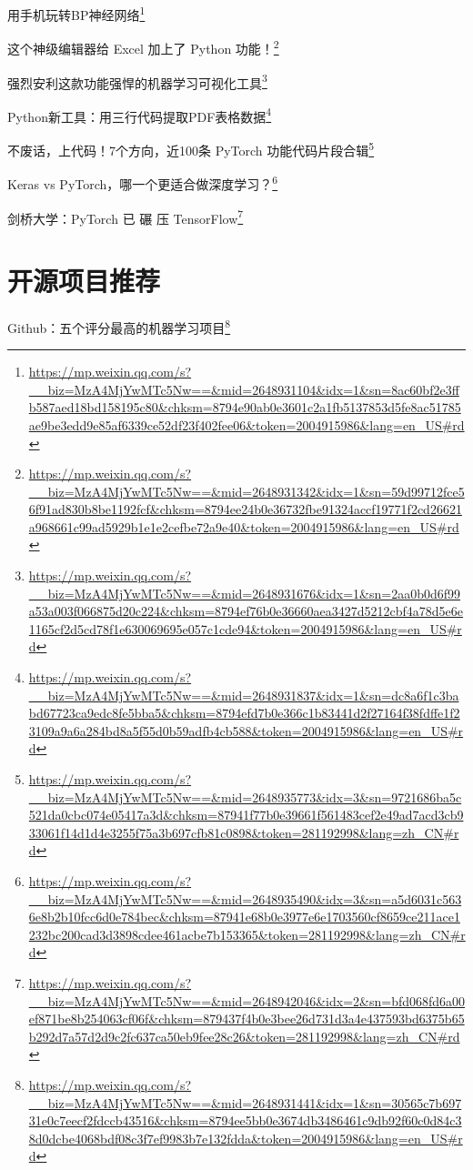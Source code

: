 \documentclass[]{ctexbook}
\renewcommand{\href}[2]{#2\footnote{\url{#1}}}
\begin{document}
\href{https://mp.weixin.qq.com/s?__biz=MzA4MjYwMTc5Nw==\&mid=2648931104\&idx=1\&sn=8ac60bf2e3ffb587aed18bd158195c80\&chksm=8794e90ab0e3601c2a1fb5137853d5fe8ac51785ae9be3edd9e85af6339ce52df23f402fee06\&token=2004915986\&lang=en_US\#rd}{用手机玩转BP神经网络}

\href{https://mp.weixin.qq.com/s?__biz=MzA4MjYwMTc5Nw==\&mid=2648931342\&idx=1\&sn=59d99712fce56f91ad830b8be1192fcf\&chksm=8794ee24b0e36732fbe91324accf19771f2cd26621a968661c99ad5929b1e1e2cefbe72a9e40\&token=2004915986\&lang=en_US\#rd}{这个神级编辑器给 Excel 加上了 Python 功能！}

\href{https://mp.weixin.qq.com/s?__biz=MzA4MjYwMTc5Nw==\&mid=2648931676\&idx=1\&sn=2aa0b0d6f99a53a003f066875d20c224\&chksm=8794ef76b0e36660aea3427d5212cbf4a78d5e6e1165cf2d5cd78f1e630069695e057c1cde94\&token=2004915986\&lang=en_US\#rd}{强烈安利这款功能强悍的机器学习可视化工具}

\href{https://mp.weixin.qq.com/s?__biz=MzA4MjYwMTc5Nw==\&mid=2648931837\&idx=1\&sn=dc8a6f1c3babd67723ca9edc8fe5bba5\&chksm=8794efd7b0e366c1b83441d2f27164f38fdffe1f23109a9a6a284bd8a5f55d0b59adfb4cb588\&token=2004915986\&lang=en_US\#rd}{Python新工具：用三行代码提取PDF表格数据}

\href{https://mp.weixin.qq.com/s?__biz=MzA4MjYwMTc5Nw==\&mid=2648935773\&idx=3\&sn=9721686ba5c521da0cbc074e05417a3d\&chksm=87941f77b0e39661f561483cef2e49ad7acd3cb933061f14d1d4e3255f75a3b697cfb81c0898\&token=281192998\&lang=zh_CN\#rd}{不废话，上代码！7个方向，近100条 PyTorch 功能代码片段合辑}

\href{https://mp.weixin.qq.com/s?__biz=MzA4MjYwMTc5Nw==\&mid=2648935490\&idx=3\&sn=a5d6031c5636e8b2b10fcc6d0e784bec\&chksm=87941e68b0e3977e6e1703560cf8659ce211ace1232bc200cad3d3898cdee461acbe7b153365\&token=281192998\&lang=zh_CN\#rd}{Keras vs PyTorch，哪一个更适合做深度学习？}

\href{https://mp.weixin.qq.com/s?__biz=MzA4MjYwMTc5Nw==\&mid=2648942046\&idx=2\&sn=bfd068fd6a00ef871be8b254063cf06f\&chksm=879437f4b0e3bee26d731d3a4e437593bd6375b65b292d7a57d2d9c2fc637ca50eb9fee28c26\&token=281192998\&lang=zh_CN\#rd}{剑桥大学：PyTorch 已 碾 压 TensorFlow}

\hypertarget{ux5f00ux6e90ux9879ux76eeux63a8ux8350}{%
\chapter{开源项目推荐}\label{ux5f00ux6e90ux9879ux76eeux63a8ux8350}}

\href{https://mp.weixin.qq.com/s?__biz=MzA4MjYwMTc5Nw==\&mid=2648931441\&idx=1\&sn=30565c7b69731e0c7eecf2fdccb43516\&chksm=8794ee5bb0e3674db3486461c9db92f60c0d84c38d0dcbe4068bdf08c3f7ef9983b7e132fdda\&token=2004915986\&lang=en_US\#rd}{Github：五个评分最高的机器学习项目}
\end{document}
